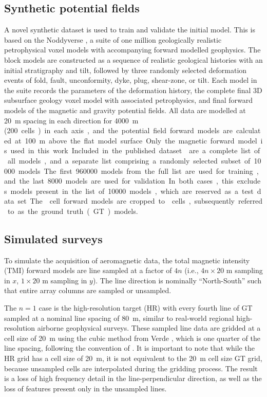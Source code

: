 \subsection{Synthetic potential fields}
A novel synthetic dataset is used to train and validate the initial model.
This is based on the Noddyverse \parencite{jessellNoddyverseMassiveData2022}, a suite of one million geologically realistic petrophysical voxel models with accompanying forward modelled geophysics.
The block models are constructed as a sequence of realistic geological histories with an initial stratigraphy and tilt, followed by three randomly selected deformation events of fold, fault, unconformity, dyke, plug, shear-zone, or tilt.
Each model in the suite records the parameters of the deformation history, the complete final 3D subsurface geology voxel model with associated petrophysics, and final forward models of the magnetic and gravity potential fields.
All data are modelled at \qty{20}{\m} spacing in each direction for \qty{4000}{\m} (\qty{200} cells) in each axis, and the potential field forward models are calculated at \qty{100}{\m} above the flat model surface.
Only the magnetic forward model is used in this work.

Included in the published dataset \parencite{jessellNoddyverseMassiveData2022} are a complete list of all models, and a separate list comprising a randomly selected subset of \qty{10000} models.
The first \qty{960000} models from the full list are used for training, and the last \qty{8000} models are used for validation.
In both cases, this excludes models present in the list of \qty{10000} models, which are reserved as a test data set.
The  cell forward models are cropped to  cells, subsequently referred to as the ground truth (GT) models.

\subsection{Simulated surveys}
\label{sec:simsurveys}
To simulate the acquisition of aeromagnetic data, the  total magnetic intensity (TMI) forward models are line sampled at a factor of \(4n\)  (i.e., \(4n \times 20\) m sampling in \(x\), \(1 \times 20\) m sampling in \(y\)).
The line direction is nominally ``North-South'' such that entire array columns are sampled or unsampled.

The \(n = 1\) case is the high-resolution target (HR) with every fourth line of GT sampled at a nominal line spacing of \qty{80}{\m}, similar to real-world regional high-resolution airborne geophysical surveys.
These sampled line data are gridded at a cell size of \qty{20}{\m} using the cubic method from Verde \parencite{uieda2018}, which is one quarter of the line spacing, following the convention of \textcite{reidAeromagneticSurveyDesign1980}.
It is important to note that while the HR grid has a cell size of \qty{20}{\m}, it is not equivalent to the \qty{20}{\m} cell size GT grid, because unsampled cells are interpolated during the gridding process.
The result is a loss of high frequency detail in the line-perpendicular direction, as well as the loss of features present only in the unsampled lines.

